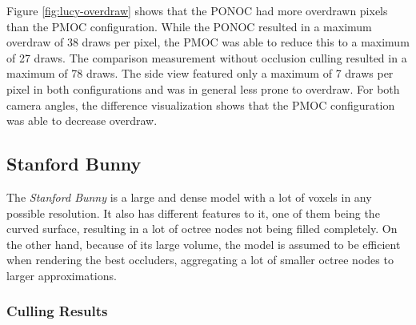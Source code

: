 \noindent
Figure \ref{fig:lucy-overdraw} shows that the \ac{PONOC} had more overdrawn pixels than the \ac{PMOC} configuration. 
While the \ac{PONOC} resulted in a maximum overdraw of 38 draws per pixel, the \ac{PMOC} was able to reduce this to 
a maximum of 27 draws. The comparison measurement without occlusion culling resulted in a maximum of 78 draws. The 
side view featured only a maximum of 7 draws per pixel in both configurations and was in general less prone to overdraw.
For both camera angles, the difference visualization shows that the \ac{PMOC} configuration was able to decrease overdraw. 

\clearpage



\subsection*{Stanford Bunny}

The \emph{Stanford Bunny} is a large and dense model with a lot of voxels in any possible resolution.
It also has different features to it, one of them being the curved surface, resulting in a lot of octree 
nodes not being filled completely. On the other hand, because of its large volume, the model is assumed 
to be efficient when rendering the best occluders, aggregating a lot of smaller octree nodes to larger 
approximations.

\subsubsection*{Culling Results} \label{subsubsec-culling-results-bunny}


